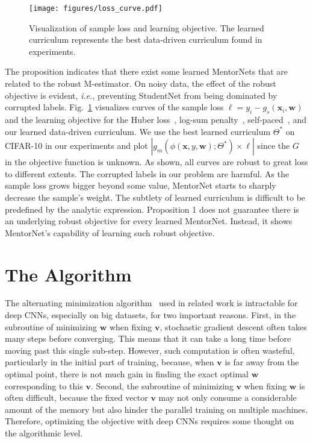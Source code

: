 \documentclass{article}
\newcommand{\ie}{\emph{i.e.}} \newcommand{\Ie}{\emph{I.e}}
\begin{document}
\begin{figure}[ht]
\vspace{-3mm}
\centering
\texttt{[image: figures/loss\_curve.pdf]}
\vspace{-3mm}
\caption{\label{fig:loss_curve}Visualization of sample loss and learning objective. The learned curriculum represents the best data-driven curriculum found in experiments.}
\vspace{-2mm}
\end{figure}

The proposition indicates that there exist some learned MentorNets that are related to the robust M-estimator. On noisy data, the effect of the robust objective is evident, \ie, preventing StudentNet from being dominated by corrupted labels. Fig.~\ref{fig:loss_curve} visualizes curves of the sample loss $\ell=y_i-g_s(\mathbf{x}_i, \mathbf{w})$ and the learning objective for the Huber loss~\cite{huber1964robust}, log-sum penalty~\cite{candes2008enhancing}, self-paced~\cite{kumar2010self}, and our learned data-driven curriculum. We use the best learned curriculum $\Theta^*$ on CIFAR-10 in our experiments and plot $|g_m(\phi(\mathbf{x},y,\mathbf{w});\Theta^*) \times \ell|$ since the $G$ in the objective function is unknown. As shown, all curves are robust to great loss to different extents. The corrupted labels in our problem are harmful. As the sample loss grows bigger beyond some value, MentorNet starts to sharply decrease the sample's weight. The subtlety of learned curriculum is difficult to be predefined by the analytic expression. Proposition 1 does not guarantee there is an underlying robust objective for every learned MentorNet. Instead, it shows MentorNet's capability of learning such robust objective. 



\vspace{-2mm}
\section{The Algorithm}\label{sec:algorithm}
\vspace{-1mm}

The alternating minimization algorithm~\cite{csiszar1984information} used in related work is intractable for deep CNNs, especially on big datasets, for two important reasons. First, in the subroutine of minimizing $\mathbf{w}$ when fixing $\mathbf{v}$, stochastic gradient descent often takes many steps before converging. This means that it can take a long time before moving past this single sub-step. However, such computation is often wasteful, particularly in the initial part of training, because, when $\mathbf{v}$ is far away from the optimal point, there is not much gain in finding the exact optimal $\mathbf{w}$ corresponding to this $\mathbf{v}$. Second, the subroutine of minimizing $\mathbf{v}$ when fixing $\mathbf{w}$ is often difficult, because the fixed vector $\mathbf{v}$ may not only consume a considerable amount of the memory but also hinder the parallel training on multiple machines. Therefore, optimizing the objective with deep CNNs requires some thought on the algorithmic level.
\end{document}
